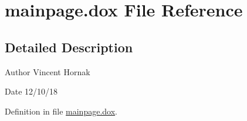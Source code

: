 \hypertarget{mainpage_8dox}{
\section{mainpage.dox File Reference}
\label{mainpage_8dox}
}


\subsection{Detailed Description}
\begin{DoxyAuthor}{Author}
Vincent Hornak 
\end{DoxyAuthor}
\begin{DoxyDate}{Date}
12/10/18
\end{DoxyDate}


Definition in file \hyperlink{mainpage_8dox_source}{mainpage.dox}.